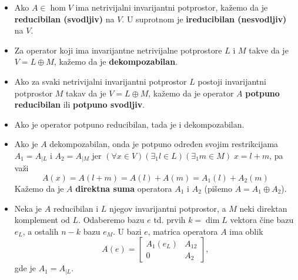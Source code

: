\documentclass[a4paper,12pt,twoside]{report}
\numberwithin{algorithm}{section}
\begin{document}
\begin{itemize}
    \item Ako $A \in \hom V$ ima netrivijalni invarijantni potprostor, kažemo da je \textbf{reducibilan (svodljiv)} na $V$. U suprotnom je \textbf{ireducibilan (nesvodljiv)} na $V$.
    \item Za operator koji ima invarijantne netrivijalne potprostore $L$ i $M$ takve da je $V = L \oplus M$, kažemo da je \textbf{dekompozabilan}.
    \item Ako za svaki netrivijalni invarijantni potprostor $L$ postoji invarijantni potprostor $M$ takav da je $V = L \oplus M$, kažemo da je operator $A$ \textbf{potpuno reducibilan} ili \textbf{potpuno svodljiv}.
    \item Ako je operator potpuno reducibilan, tada je i dekompozabilan.
    \item Ako je $A$ dekompozabilan, onda je potpuno određen svojim restrikcijama $A_1 = A_{|L}$ i $A_2 = A_{|M}$ jer $(\forall 
    x \in V)(\exists_1 l \in L)(\exists_1 m \in M)\;x= l + m$, pa važi
    \[ A(x) = A(l + m) = A(l) + A(m) = A_1(l) + A_2(m) \]
    Kažemo da je $A$ \textbf{direktna suma} operatora $A_1$ i $A_2$ (pišemo $A = A_1 \oplus A_2$).
    \item Neka je $A$ reducibilan i $L$ njegov invarijantni potprostor, a $M$ neki direktan komplement od $L$. Odaberemo bazu 
    $e$ td. prvih $k = \dim L$ vektora čine bazu $e_L$, a ostalih $n-k$ bazu $e_M$. U bazi $e$, matrica operatora $A$ ima oblik
    \[ A(e) = \begin{bmatrix}
        A_1(e_L) & A_{12} \\
        0 & A_2
    \end{bmatrix}, \]
    gde je $A_1 = A_{|L}$.


\end{itemize}
\end{document}
